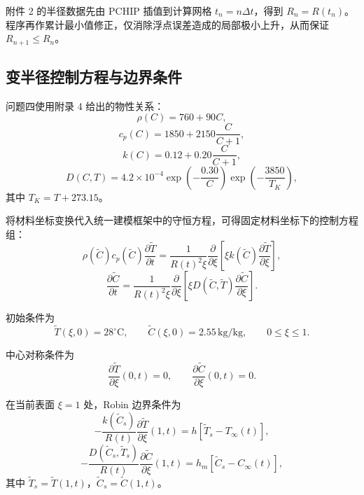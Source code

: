 \documentclass[withoutpreface,bwprint]{cumcm_thesis}
\begin{document}
附件 2 的半径数据先由 PCHIP 插值到计算网格 \(t_n = n\Delta t\)，得到 \(R_n = R(t_n)\)。程序再作累计最小值修正，仅消除浮点误差造成的局部极小上升，从而保证 \(R_{n+1} \le R_n\)。

\subsection{变半径控制方程与边界条件}

问题四使用附录 4 给出的物性关系：
\begin{equation}
\rho(C) = 760 + 90C,
\end{equation}
\begin{equation}
c_p(C) = 1850 + 2150\frac{C}{C+1},
\end{equation}
\begin{equation}
k(C) = 0.12 + 0.20\frac{C}{C+1},
\end{equation}
\begin{equation}
D(C,T) = 4.2\times 10^{-4}\exp\left(-\frac{0.30}{C}\right)\exp\left(-\frac{3850}{T_K}\right),
\end{equation}
其中 \(T_K = T + 273.15\)。

将材料坐标变换代入统一建模框架中的守恒方程，可得固定材料坐标下的控制方程组：
\begin{equation}
\rho(\tilde{C})c_p(\tilde{C})\frac{\partial \tilde{T}}{\partial t} = \frac{1}{R(t)^2\xi}\frac{\partial}{\partial \xi}\left[\xi k(\tilde{C})\frac{\partial \tilde{T}}{\partial \xi}\right],
\end{equation}
\begin{equation}
\frac{\partial \tilde{C}}{\partial t} = \frac{1}{R(t)^2\xi}\frac{\partial}{\partial \xi}\left[\xi D(\tilde{C},\tilde{T})\frac{\partial \tilde{C}}{\partial \xi}\right].
\end{equation}

初始条件为
\begin{equation}
\tilde{T}(\xi,0) = 28^\circ\text{C}, \qquad \tilde{C}(\xi,0) = 2.55\,\text{kg/kg}, \qquad 0 \le \xi \le 1.
\end{equation}

中心对称条件为
\begin{equation}
\frac{\partial \tilde{T}}{\partial \xi}(0,t) = 0, \qquad \frac{\partial \tilde{C}}{\partial \xi}(0,t) = 0.
\end{equation}

在当前表面 \(\xi=1\) 处，Robin 边界条件为
\begin{equation}
-\frac{k(\tilde{C}_s)}{R(t)}\frac{\partial \tilde{T}}{\partial \xi}(1,t) = h\left[\tilde{T}_s - T_\infty(t)\right],
\end{equation}
\begin{equation}
-\frac{D(\tilde{C}_s,\tilde{T}_s)}{R(t)}\frac{\partial \tilde{C}}{\partial \xi}(1,t) = h_m\left[\tilde{C}_s - C_\infty(t)\right],
\end{equation}
其中 \(\tilde{T}_s = \tilde{T}(1,t)\)，\(\tilde{C}_s = \tilde{C}(1,t)\)。
\end{document}
